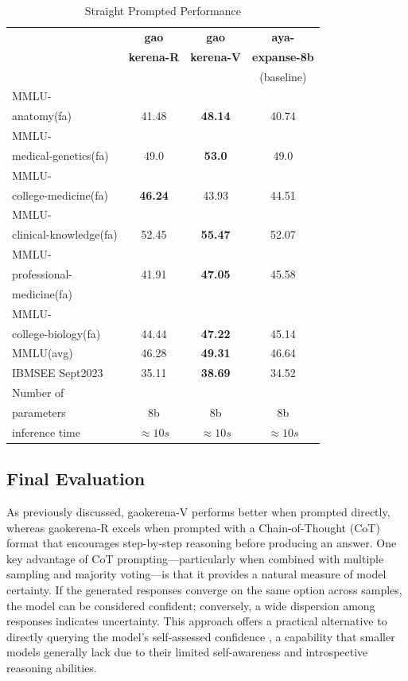 \documentclass[conference]{IEEEtran}
\begin{document}
	\begin{table}[ht]
		\centering
		\caption{Straight Prompted Performance}
		\begin{tabular}{|l|c|c|c|}  
			\hline
			\textbf{} & \textbf{gao} & \textbf{gao} & \textbf{aya-} \\ 
			& \textbf{kerena-R} &  \textbf{kerena-V} & \textbf{expanse-8b} \\
			&   & &(baseline)  \\ \hline
			MMLU- &  &  &  \\ 
			anatomy(fa)  & 41.48 & \textbf{48.14}  & 40.74  \\ \hline
			MMLU- &    &   &   \\
			medical-genetics(fa) & 49.0  & \textbf{53.0}  &  49.0 \\ \hline
			MMLU- &  &    &  \\
			college-medicine(fa) & \textbf{46.24} & 43.93  & 44.51   \\ \hline
			MMLU- &    &  &  \\
			clinical-knowledge(fa) & 52.45 & \textbf{55.47}  & 52.07  \\ \hline
			MMLU- &  &  &  \\
			professional-& 41.91  & \textbf{47.05}  & 45.58   \\
                        medicine(fa)& &   &   \\ \hline
			MMLU- &  &  &  \\
			college-biology(fa)& 44.44 & \textbf{47.22}  &  45.14 \\ \hline
			MMLU(avg) & 46.28 & \textbf{49.31}  & 46.64 \\ \hline
			IBMSEE Sept2023 & 35.11  &\textbf{38.69} & 34.52  \\ \hline
			Number of&  &  &  \\
			parameters & 8b & 8b & 8b \\ \hline
			inference time & $\approx10s$ & $\approx 10s$ & $\approx 10s$ \\  \hline
		\end{tabular}
		\label{tab:med_knowledge_comparison}
	\end{table}


           \subsection{Final Evaluation}
As previously discussed, gaokerena-V performs better when prompted directly, whereas gaokerena-R excels when prompted with a Chain-of-Thought (CoT) format that encourages step-by-step reasoning before producing an answer. One key advantage of CoT prompting—particularly when combined with multiple sampling and majority voting—is that it provides a natural measure of model certainty. If the generated responses converge on the same option across samples, the model can be considered confident; conversely, a wide dispersion among responses indicates uncertainty. This approach offers a practical alternative to directly querying the model’s self-assessed confidence
\cite{b27}
, a capability that smaller models generally lack due to their limited self-awareness and introspective reasoning abilities.
\end{document}
